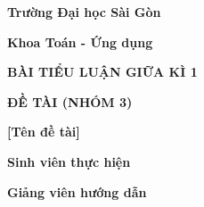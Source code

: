 \documentclass[12pt]{article}
\begin{document}
\setlength{\parindent}{10pt}
\begin{titlepage}

    \begin{center}
    
    \textbf{\Large Trường Đại học Sài Gòn}
    
    \textbf{\Large Khoa Toán - Ứng dụng}
        
    \end{center}
    
    \vspace{2cm}
    
    \begin{center}
    
    \textbf{\huge BÀI TIỂU LUẬN GIỮA KÌ 1}
    
    \end{center}
    
    \vspace{1cm}
    
    \begin{center}
    
    \textbf{\huge ĐỀ TÀI (NHÓM 3)}

    \vspace{.5cm}
    
    \textbf{\huge [Tên đề tài]}
    
    \end{center}
    
    \vspace{1cm}
    
    \begin{center}
    
    \textbf{\Large Sinh viên thực hiện}
    
    \vspace{.5cm}

    
    \vspace{.4cm}

    
    \end{center}
    
    \vspace{1cm}
    
    \begin{center}
    
    \textbf{\Large Giảng viên hướng dẫn}
    
    \vspace{.5cm}

    
    \end{center}
    
    \vspace{1cm}
    
    \begin{center}
    
    
    \end{center}
    
    \end{titlepage}
\end{document}

